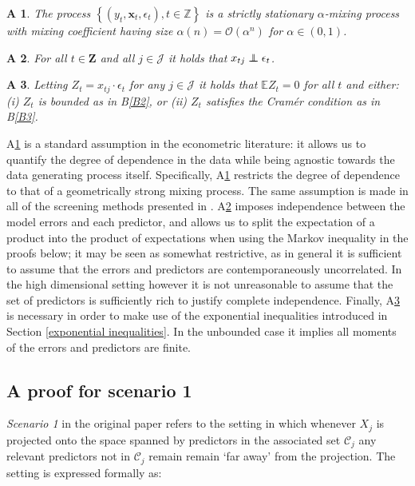 \documentclass[11pt]{report}\usepackage[utf8]{inputenc}
\newtheorem{assump}{A}
\newcommand\independent{\protect\mathpalette{\protect\independenT}{\perp}}
\def\independenT#1#2{\mathrel{\rlap{$#1#2$}\mkern2mu{#1#2}}}
\begin{document}
\begin{assump} \label{A7}
    The process $\left \{ \left ( y_t, \boldsymbol{x}_t, \epsilon_t \right ), t \in \mathbb{Z} \right \}$ is a strictly stationary $\alpha$-mixing process with mixing coefficient having size $\alpha(n) = \mathcal{O}(\alpha^n)$ for $\alpha \in (0,1)$.
\end{assump}

\begin{assump} \label{A8}
    For all $t \in \mathbf{Z}$ and all $j \in \mathcal{J}$ it holds that $x_{tj} \independent \epsilon_t$.
\end{assump}

\begin{assump} \label{A9}
    Letting $Z_t = x_{tj} \cdot \epsilon_t$ for any $j \in \mathcal{J}$ it holds that $\mathbb{E}Z_t = 0$ for all $t$ and either: (i) $Z_t$ is bounded as in B\ref{B2}, or (ii) $Z_t$ satisfies the Cramér condition as in B\ref{B3}.
\end{assump}

A\ref{A7} is a standard assumption in the econometric literature: it allows us to quantify the degree of dependence in the data while being agnostic towards the data generating process itself. Specifically, A\ref{A7} restricts the degree of dependence to that of a geometrically strong mixing process. The same assumption is made in all of the screening methods presented in \cite{chen2018semiparametric}. A\ref{A8} imposes independence between the model errors and each predictor, and allows us to split the expectation of a product into the product of expectations when using the Markov inequality in the proofs below; it may be seen as somewhat restrictive, as in general it is sufficient to assume that the errors and predictors are contemporaneously uncorrelated. In the high dimensional setting however it is not unreasonable to assume that the set of predictors is sufficiently rich to justify complete independence. Finally, A\ref{A9} is necessary in order to make use of the exponential inequalities introduced in Section \ref{exponential inequalities}. In the unbounded case it implies all moments of the errors and predictors are finite. 


\subsection{A proof for scenario 1} \label{scenario 1}

\textit{Scenario 1} in the original paper refers to the setting in which whenever $X_j$ is projected onto the space spanned by predictors in the associated set $\mathcal{C}_j$ any relevant predictors not in $\mathcal{C}_j$ remain remain `far away' from the projection. The setting is expressed formally as: 
\end{document}

